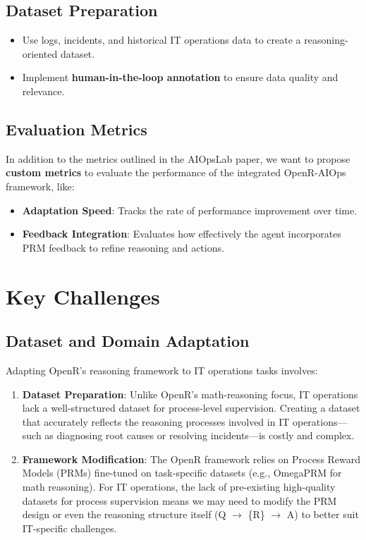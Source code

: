 \documentclass[conference]{IEEEtran}
\begin{document}
\subsection{Dataset Preparation}
\begin{itemize}
    \item Use logs, incidents, and historical IT operations data to create a reasoning-oriented dataset.
    \item Implement \textbf{human-in-the-loop annotation} to ensure data quality and relevance.
\end{itemize}

\subsection{Evaluation Metrics}
In addition to the metrics outlined in the AIOpsLab paper, we want to propose \textbf{custom metrics} to evaluate the performance of the integrated OpenR-AIOps framework, like:
\begin{itemize}
    \item \textbf{Adaptation Speed}: Tracks the rate of performance improvement over time.
    \item \textbf{Feedback Integration}: Evaluates how effectively the agent incorporates PRM feedback to refine reasoning and actions.
\end{itemize} 

\section{Key Challenges}

\subsection{Dataset and Domain Adaptation}
Adapting OpenR's reasoning framework to IT operations tasks involves:
\begin{enumerate}
    \item \textbf{Dataset Preparation}: Unlike OpenR's math-reasoning focus, IT operations lack a well-structured dataset for process-level supervision. Creating a dataset that accurately reflects the reasoning processes involved in IT operations—such as diagnosing root causes or resolving incidents—is costly and complex.
    \item \textbf{Framework Modification}: The OpenR framework relies on Process Reward Models (PRMs) fine-tuned on task-specific datasets (e.g., OmegaPRM for math reasoning). For IT operations, the lack of pre-existing high-quality datasets for process supervision means we may need to modify the PRM design or even the reasoning structure itself (Q $\rightarrow$ \{R\} $\rightarrow$ A) to better suit IT-specific challenges.
\end{enumerate}
\end{document}
